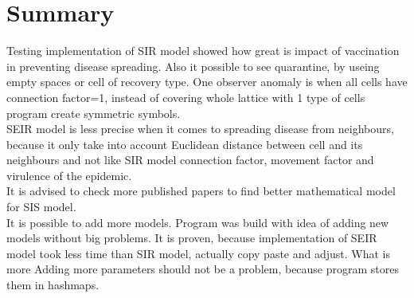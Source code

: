 \documentclass[a4paper, 11pt]{article}
\begin{document}
\section{Summary}
Testing implementation of SIR model showed how great is impact of vaccination in preventing disease spreading. Also it possible to see quarantine, by useing empty spaces or cell of recovery type. One observer anomaly is when all cells have connection factor=1, instead of covering whole lattice with 1 type of cells program create symmetric symbols.\\
SEIR model is less precise when it comes to spreading disease from neighbours, because it only take into account Euclidean distance between cell and its neighbours and not like SIR model connection factor, movement factor and virulence of the epidemic.\\
It is advised to check more published papers to find better mathematical model for SIS model.\\
It is possible to add more models. Program was build with idea of adding new models without big problems. It is proven, because implementation of SEIR model took less time than SIR model, actually copy paste and adjust. What is more Adding more parameters should not be a problem, because program stores them in hashmaps.
%
\printbibliography
\end{document}
